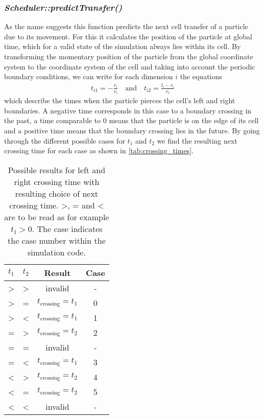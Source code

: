 \subsubsection{\quad \textit{Scheduler::predictTransfer()}}
As the name suggests this function predicts the next cell transfer of a particle due to its movement. For this it calculates the position of the particle at global time, which for a valid state of the simulation always lies within its cell. By transforming the momentary position of the particle from the global coordinate system to the coordinate system of the cell and taking into account the periodic boundary conditions, we can write for each dimension $i$ the equations
\begin{align}
t_{i1}=-\frac{r_i}{v_i} \quad \text{and} \quad t_{i2}=\frac{l_i-r_i}{v_i}
\end{align}
which describe the times when the particle pierces the cell's left and right boundaries. A negative time corresponds in this case to a boundary crossing in the past, a time comparable to 0 means that the particle is on the edge of its cell and a positive time means that the boundary crossing lies in the future. By going through the different possible cases for $t_1$ and $t_2$ we find the resulting next crossing time for each case as shown in \autoref{tab:crossing_times}.
\begin{table}[h]
\centering
\begin{tabular}{c|c||c|c}
$t_1$ & $t_2$ & Result & Case \\ \hline
> & > & invalid & - \\ \hline
> & = & $t_{\text{crossing}} = t_1$ & 0 \\ \hline
> & < & $t_{\text{crossing}} = t_1$ & 1 \\ \hline
= & > & $t_{\text{crossing}} = t_2$ & 2\\ \hline
= & = & invalid & - \\ \hline
= & < & $t_{\text{crossing}} = t_1$ & 3 \\ \hline
< & > & $t_{\text{crossing}} = t_2$ & 4 \\ \hline
< & = & $t_{\text{crossing}} = t_2$ & 5\\ \hline
< & < & invalid & - \\ \hline
\end{tabular}
\caption[Cell boundary crossing conditions]{Possible results for left and right crossing time with resulting choice of next crossing time. >, = and < are to be read as for example $t_1 > 0$. The case indicates the case number within the simulation code.}
\label{tab:crossing_times}
\end{table}

